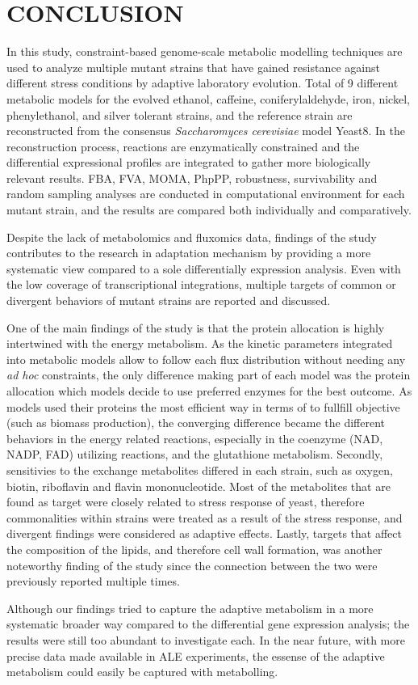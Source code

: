 
\chapter{CONCLUSION}

In this study, constraint-based genome-scale metabolic modelling techniques are used to analyze multiple mutant strains that have gained resistance against different stress conditions by adaptive laboratory evolution. Total of 9 different metabolic models for the evolved ethanol, caffeine, coniferylaldehyde, iron, nickel, phenylethanol, and silver tolerant strains, and the reference strain are reconstructed from the consensus \emph{Saccharomyces cerevisiae} model Yeast8. In the reconstruction process, reactions are enzymatically constrained and the differential expressional profiles are integrated to gather more biologically relevant results. FBA, FVA, MOMA, PhpPP, robustness, survivability and random sampling analyses are conducted in computational environment for each mutant strain, and the results are compared both individually and comparatively.

Despite the lack of metabolomics and fluxomics data, findings of the study contributes to the research in adaptation mechanism by providing a more systematic view compared to a sole differentially expression analysis. Even with the low coverage of transcriptional integrations, multiple targets of common or divergent behaviors of mutant strains are reported and discussed.

One of the main findings of the study is that the protein allocation is highly intertwined with the energy metabolism. As the kinetic parameters integrated into metabolic models allow to follow each flux distribution without needing any \emph{ad hoc} constraints, the only difference making part of each model was the protein allocation which models decide to use preferred enzymes for the best outcome. As models used their proteins the most efficient way in terms of to fullfill objective (such as biomass production), the converging difference became the different behaviors in the energy related reactions, especially in the coenzyme (NAD, NADP, FAD) utilizing reactions, and the glutathione metabolism. Secondly, sensitivies to the exchange metabolites differed in each strain, such as oxygen, biotin, riboflavin and flavin mononucleotide. Most of the metabolites that are found as target were closely related to stress response of yeast, therefore commonalities within strains were treated as a result of the stress response, and divergent findings were considered as adaptive effects. Lastly, targets that affect the composition of the lipids, and therefore cell wall formation, was another noteworthy finding of the study since the connection between the two were previously reported multiple times.

Although our findings tried to capture the adaptive metabolism in a more systematic broader way compared to the differential gene expression analysis; the results were still too abundant to investigate each. In the near future, with more precise data made available in ALE experiments, the essense of the adaptive metabolism could easily be captured with metabolling.
